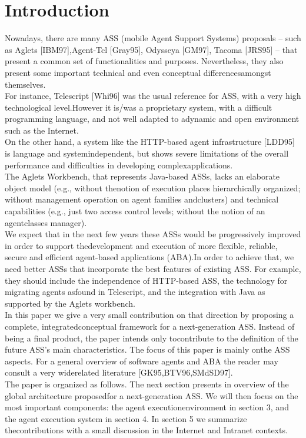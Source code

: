 \documentclass{article}
\begin{document}
\section{Introduction}
 Nowadays, there are many ASS (mobile Agent Support Systems) proposals – such as Aglets [IBM97],Agent-Tcl [Gray95], Odysseya [GM97], Tacoma [JRS95] – that present a common set of functionalities and purposes. Nevertheless, they also present some important technical and even conceptual differencesamongst themselves.\\
 For instance, Telescript [Whi96] was the usual reference for ASS, with a very high technological level.However it is/was a proprietary system, with a difficult programming language, and not well adapted to adynamic and open environment such as the Internet.\\
 On the other hand, a system like the HTTP-based agent infrastructure [LDD95] is language and systemindependent, but shows severe limitations of the overall performance and difficulties in developing complexapplications.\\
 The Aglets Workbench, that represents Java-based ASSs, lacks an elaborate object model (e.g., without thenotion of execution places hierarchically organized; without management operation on agent families andclusters) and technical capabilities (e.g., just two access control levels; without the notion of an agentclasses manager).\\
 We expect that in the next few years these ASSs would be progressively improved in order to support thedevelopment and execution of more flexible, reliable, secure and efficient agent-based applications (ABA).In order to achieve that, we need better ASSs that incorporate the best features of existing ASS. For example, they should include the independence of HTTP-based ASS, the technology for migrating agents asfound in Telescript, and the integration with Java as supported by the Aglets workbench.\\
 In this paper we give a very small contribution on that direction by proposing a complete, integratedconceptual framework for a next-generation ASS. Instead of being a final product, the paper intends only tocontribute to the definition of the future ASS’s main characteristics. The focus of this paper is mainly onthe ASS aspects. For a general overview of software agents and ABA the reader may consult a very widerelated literature [GK95,BTV96,SMdSD97].\\
 The paper is organized as follows. The next section presents in overview of the global architecture proposedfor a next-generation ASS. We will then focus on the most important components: the agent executionenvironment in section 3, and the agent execution system in section 4. In section 5 we summarize thecontributions with a small discussion in the Internet and Intranet contexts.
\end{document}
